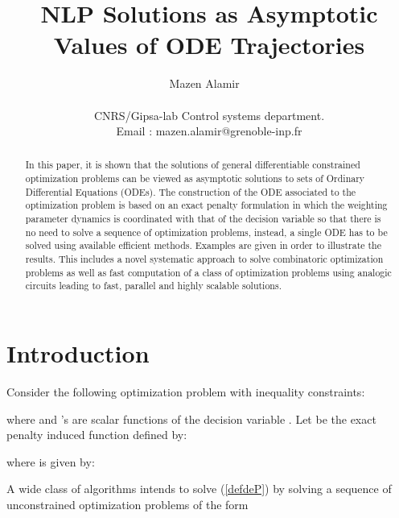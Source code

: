 \documentclass{article}
\begin{document}
\title{NLP Solutions as Asymptotic Values of ODE Trajectories}
\author{Mazen Alamir \ \\ \ \\  CNRS/Gipsa-lab Control systems department.\\ Email : mazen.alamir@grenoble-inp.fr}




\date{}



\maketitle

\begin{abstract}
\noindent In this paper, it is shown that the solutions of general differentiable constrained optimization problems can be viewed as asymptotic solutions to  sets of Ordinary Differential Equations (ODEs). The construction of the ODE associated to the optimization problem is based on an exact penalty formulation in which the weighting parameter dynamics is coordinated with that of the decision variable so that there is no need to solve a sequence of optimization problems, instead, a single ODE has to be solved using available efficient methods. Examples are given in order to illustrate the results. This includes a novel systematic approach to solve combinatoric optimization problems as well as fast computation of a class of optimization problems using analogic circuits leading to fast, parallel and highly scalable solutions.
\end{abstract}

\section{Introduction}
\label{secintro}
Consider the following optimization problem with inequality constraints:
 
where  and 's are scalar functions of the decision variable . Let  be the exact penalty induced function defined by:
 
where  is given by:
 
A wide class of algorithms intends to solve (\ref{defdeP}) by solving a sequence of unconstrained optimization problems of the form
 
\end{document}
